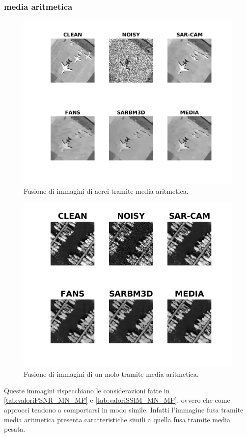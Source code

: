 \subsubsection{media aritmetica}
\begin{figure}[H] 
    \centering
    \includegraphics[width=1.1\textwidth]{utils/MNairplane00.png}
    \caption{Fusione di immagini di aerei tramite media aritmetica.}
    \label{fig:airplane00MN}
  \end{figure}
  \begin{figure}[H] 
    \centering
    \includegraphics[width=1.0\textwidth]{utils/MNharbor03.png}
    \caption{Fusione di immagini di un molo tramite media aritmetica.}
    \label{fig:harbor03MN}
\end{figure}
Queste immagini rispecchiano le considerazioni fatte in \ref{tab:valoriPSNR_MN_MP} e \ref{tab:valoriSSIM_MN_MP}, ovvero che 
come approcci tendono a comportarsi in modo simile. Infatti l'immagine fusa tramite media aritmetica presenta caratteristiche simili a quella
fusa tramite media pesata. 

